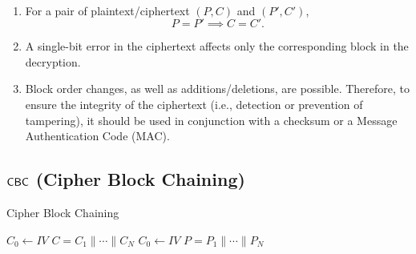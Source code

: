 \vspace{24pt}
\begin{remark}
\ \begin{enumerate}[(1)]
	\item For a pair of plaintext/ciphertext $(P, C)$ and $(P', C')$, \[
	P=P'\implies C=C'.
	\]
	\item A single-bit error in the ciphertext affects only the corresponding block in the decryption.
	\item Block order changes, as well as additions/deletions, are possible. Therefore, to ensure the integrity of the ciphertext (i.e., detection or prevention of tampering), it should be used in conjunction with a checksum or a Message Authentication Code (MAC).
\end{enumerate}
\end{remark}

\newpage
\subsection{$\mathsf{CBC}$ (Cipher Block Chaining)}
\begin{algorithm}[H]
	\caption{Cipher Block Chaining}
	\begin{multicols}{2}
		\BlankLine
		$C_0\gets IV$\;
		\Return $C=C_1\parallel\cdots\parallel C_N$\;
		\columnbreak %
		\setcounter{AlgoLine}{0}  %
		\BlankLine
		$C_0\gets IV$\;
		\Return $P=P_1\parallel\cdots\parallel P_N$\;
	\end{multicols}
	\BlankLine
\end{algorithm}

